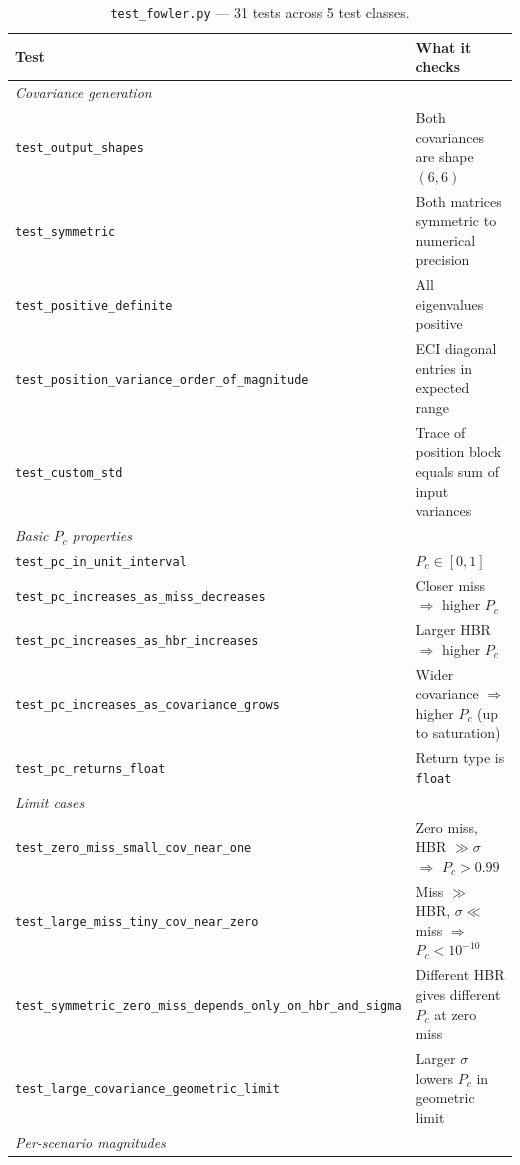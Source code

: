 \documentclass[11pt]{article}
\begin{document}
\begin{table}[htb]
\centering
\small
\caption{\texttt{test\_fowler.py} — 31 tests across 5 test classes.}
\label{tab:test_fowler}
\begin{tabular}{lp{10cm}}
  \toprule
  Test & What it checks \\
  \midrule
  \multicolumn{2}{l}{\textit{Covariance generation}} \\
  \texttt{test\_output\_shapes} & Both covariances are shape $(6, 6)$ \\
  \texttt{test\_symmetric} & Both matrices symmetric to numerical precision \\
  \texttt{test\_positive\_definite} & All eigenvalues positive \\
  \texttt{test\_position\_variance\_order\_of\_magnitude} & ECI diagonal entries in expected range \\
  \texttt{test\_custom\_std} & Trace of position block equals sum of input variances \\
  \midrule
  \multicolumn{2}{l}{\textit{Basic $P_c$ properties}} \\
  \texttt{test\_pc\_in\_unit\_interval} & $P_c \in [0, 1]$ \\
  \texttt{test\_pc\_increases\_as\_miss\_decreases} & Closer miss $\Rightarrow$ higher $P_c$ \\
  \texttt{test\_pc\_increases\_as\_hbr\_increases} & Larger HBR $\Rightarrow$ higher $P_c$ \\
  \texttt{test\_pc\_increases\_as\_covariance\_grows} & Wider covariance $\Rightarrow$ higher $P_c$ (up to saturation) \\
  \texttt{test\_pc\_returns\_float} & Return type is \texttt{float} \\
  \midrule
  \multicolumn{2}{l}{\textit{Limit cases}} \\
  \texttt{test\_zero\_miss\_small\_cov\_near\_one} & Zero miss, HBR $\gg \sigma$ $\Rightarrow$ $P_c > 0.99$ \\
  \texttt{test\_large\_miss\_tiny\_cov\_near\_zero} & Miss $\gg$ HBR, $\sigma \ll$ miss $\Rightarrow$ $P_c < 10^{-10}$ \\
  \texttt{test\_symmetric\_zero\_miss\_depends\_only\_on\_hbr\_and\_sigma} & Different HBR gives different $P_c$ at zero miss \\
  \texttt{test\_large\_covariance\_geometric\_limit} & Larger $\sigma$ lowers $P_c$ in geometric limit \\
  \midrule
  \multicolumn{2}{l}{\textit{Per-scenario magnitudes}} \\

\end{tabular}
\end{table}
\end{document}
